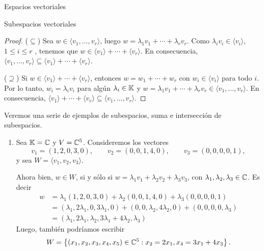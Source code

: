 \begin{chapter}{Espacios vectoriales}
\begin{section}{Subespacios vectoriales}
\begin{proof}
        ($\subseteq$) Sea $w \in \langle v_1,\ldots,v_r \rangle$, luego $w = \lambda_1 v_1 +\cdots+ \lambda_r v_r$. Como $ \lambda_i v_i \in \langle v_i \rangle$, $1 \le i \le r$ ,  tenemos que  $w \in \langle v_1 \rangle+ \cdots + \langle v_r \rangle$.  En  consecuencia, $\langle v_1,\ldots,v_r \rangle \subseteq \langle v_1 \rangle+ \cdots + \langle v_r \rangle$. 
        
        ($\supseteq$) Si $w \in \langle v_1 \rangle+ \cdots + \langle v_r \rangle$, entonces $w = w_1 + \cdots+w_r$ con $w_i \in \langle v_i\rangle$ para todo $i$. Por lo tanto, $w_i = \lambda_i v_i$ para algún $\lambda_i \in \mathbb K$ y  $w = \lambda_1 v_1 +\cdots+ \lambda_r v_r \in \langle v_1,\ldots,v_r \rangle $. En  consecuencia, $\langle v_1 \rangle+ \cdots + \langle v_r \rangle \subseteq \langle v_1,\ldots,v_r \rangle$. 
    \end{proof}



        



    \begin{ejemplo*}\label{ejemplos2} Veremos una serie de ejemplos de subespacios,  suma e intersección de subespacios.
        \begin{enumerate}
            \item\label{ejemplos2-1} Sea $\mathbb K = \mathbb C$ y $V= \mathbb C^5$. Consideremos los vectores
            \begin{equation*}
                v_1 = (1,2,0,3,0), \qquad v_2 = (0,0,1,4,0), \qquad v_3 = (0,0,0,0,1),
            \end{equation*}
            y sea $W= \langle v_1,v_2,v_3 \rangle$. 
            
            Ahora bien, $w \in W$, si y sólo si $w = \lambda_1 v_1+\lambda_2 v_2+\lambda_3 v_3$, con $\lambda_1,\lambda_2,\lambda_3 \in \mathbb C$. Es decir
            \begin{align*}
                w &= \lambda_1 (1,2,0,3,0)+\lambda_2 (0,0,1,4,0)+\lambda_3 (0,0,0,0,1) \\
                &=  (\lambda_1,2\lambda_1,0,3\lambda_1,0)+ (0,0,\lambda_2,4\lambda_2,0)+ (0,0,0,0,\lambda_3) \\ &=(\lambda_1,2\lambda_1,\lambda_2,3\lambda_1+4\lambda_2,\lambda_3)
            \end{align*} 
            Luego,  también podríamos escribir
            \begin{equation*}
                W = \left\{(x_1,x_2,x_3,x_4,x_5)\in \mathbb C^5: x_2 = 2x_1, x_4 = 3x_1+4x_3 \right\}.
            \end{equation*}
            

\end{enumerate}
\end{ejemplo*}
\end{section}
\end{chapter}
